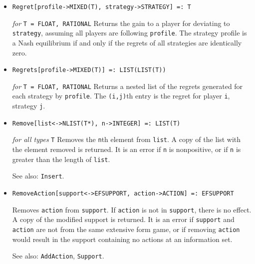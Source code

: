 \begin{itemize}
{\it for} {\tt T = FLOAT, RATIONAL}
\bd
Returns a nested list of the regrets generated for each action by
\verb+profile+.  The \verb+(i,j,k)+th entry is the regret for player
\verb+i+, infoset \verb+j+, action \verb+k+.
\ed

\item{}
\protect \large \begin{verbatim}
Regret[profile->MIXED(T), strategy->STRATEGY] =: T
\end{verbatim} \normalsize

{\it for} {\tt T = FLOAT, RATIONAL}
\bd
Returns the gain to a player for deviating to \verb+strategy+, assuming
all players are following \verb+profile+.  The strategy profile is
a Nash equilibrium if and only if the regrets of all strategies are
identically zero.
\ed

\item{}
\protect \large \begin{verbatim}
Regrets[profile->MIXED(T)] =: LIST(LIST(T))
\end{verbatim} \normalsize

{\it for} {\tt T = FLOAT, RATIONAL}
\bd
Returns a nested list of the regrets generated for each strategy by
\verb+profile+.  The \verb+(i,j)+th entry is the regret for player
\verb+i+, strategy \verb+j+.
\ed

\item{}
\protect \large \begin{verbatim}
Remove[list<->NLIST(T*), n->INTEGER] =: LIST(T)
\end{verbatim}\normalsize

{\it for all types} {\tt T}
\bd
Removes the \verb+n+th element from \verb+list+.  A copy of the list
with the element removed is returned.  It is an error if \verb+n+
is nonpositive, or if \verb+n+ is greater than the length of \verb+list+.
\item [See also:] \verb+Insert+.
\ed

\item{}
\protect \large \begin{verbatim}
RemoveAction[support<->EFSUPPORT, action->ACTION] =: EFSUPPORT
\end{verbatim}\normalsize

\bd
Removes \verb+action+ from \verb+support+.  If \verb+action+ is
not in \verb+support+, there is no effect.  A copy of the modified
support is returned.  It is an error if \verb+support+ and \verb+action+
are not from the same extensive form game, or if removing \verb+action+
would result in the support containing no actions at an information set.
\item [See also:] \verb+AddAction+, \verb+Support+.
\ed


\end{itemize}
